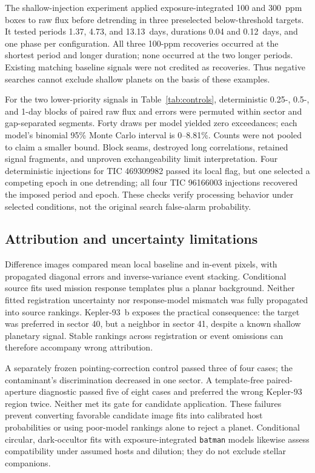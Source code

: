 The shallow-injection experiment applied exposure-integrated 100 and
300~ppm boxes to raw flux before detrending in three preselected
below-threshold targets. It tested periods 1.37, 4.73, and 13.13~days,
durations 0.04 and 0.12~days, and one phase per configuration.
All three 100-ppm recoveries occurred at the shortest period and longer
duration; none occurred at the two longer periods. Existing matching
baseline signals were not credited as recoveries. Thus negative searches
cannot exclude shallow planets on the basis of these examples.

For the two lower-priority signals in Table~\ref{tab:controls}, deterministic
0.25-, 0.5-, and 1-day blocks of paired raw flux and errors were permuted
within sector and gap-separated segments. Forty draws per model yielded
zero exceedances; each model's binomial 95\% Monte Carlo interval is
0--8.81\%. Counts were not pooled to claim a smaller bound.
Block seams, destroyed long correlations, retained signal fragments, and
unproven exchangeability limit interpretation. Four deterministic injections
for TIC 469309982 passed its local flag, but one selected a competing epoch
in one detrending; all four TIC 96166003 injections recovered the imposed
period and epoch. These checks verify processing behavior under selected
conditions, not the original search false-alarm probability.

\subsection{Attribution and uncertainty limitations}

Difference images compared mean local baseline and in-event pixels, with
propagated diagonal errors and inverse-variance event stacking. Conditional
source fits used mission response templates plus a planar background.
Neither fitted registration uncertainty nor response-model mismatch was
fully propagated into source rankings. Kepler-93~b exposes the practical
consequence: the target was preferred in sector 40, but a neighbor in
sector 41, despite a known shallow planetary signal. Stable rankings across
registration or event omissions can therefore accompany wrong attribution.

A separately frozen pointing-correction control passed three of four cases;
the contaminant's discrimination decreased in one sector. A template-free
paired-aperture diagnostic passed five of eight cases and preferred the wrong
Kepler-93 region twice. Neither met its gate for candidate application.
These failures prevent converting favorable candidate image fits into
calibrated host probabilities or using poor-model rankings alone to reject
a planet. Conditional circular, dark-occultor fits with exposure-integrated
\texttt{batman} models \cite{kreidberg2015} likewise assess compatibility
under assumed hosts and dilution; they do not exclude stellar companions.

